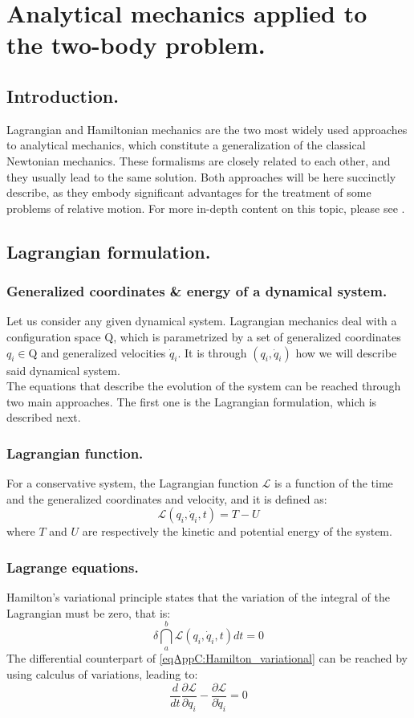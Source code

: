 \chapter{Analytical mechanics applied to the two-body problem.}
%
\label{app:App_C}
%
\section{Introduction.}
%
\indent Lagrangian and Hamiltonian mechanics are the two most widely used approaches to analytical mechanics, which constitute a generalization of the classical Newtonian mechanics. These formalisms are closely related to each other, and they usually lead to the same solution. Both approaches will be here succinctly describe, as they embody significant advantages for the treatment of some problems of relative motion. For more in-depth content on this topic, please see \cite{Wiesel, SCFormationFlying}.
%
\section{Lagrangian formulation.}
%
%
	\subsection{Generalized coordinates \& energy of a dynamical system.}
	\indent Let us consider any given dynamical system. Lagrangian mechanics deal with a configuration space $\mathrm{Q}$, which is parametrized by a set of generalized coordinates $q_i\in \mathrm{Q}$ and generalized velocities $\dot{q}_i$. It is through $(q_i, \dot{q}_i)$ how we will describe said dynamical system. \\
	\indent The equations that describe the evolution of the system can be reached through two main approaches. The first one is the Lagrangian formulation, which is described next.
	\subsection{Lagrangian function.}
	\indent For a conservative system, the Lagrangian function $\mathcal{L}$ is a function of the time and the generalized coordinates and velocity, and it is defined as:
	\[
	\mathcal{L} (q_i, \dot{q}_i, t) = T - U	
	\]
	\noindent where $T$ and $U$ are respectively the kinetic and potential energy of the system. 
	\subsection{Lagrange equations.}
	\indent Hamilton's variational principle states that the variation of the integral of the Lagrangian must be zero, that is: 
	\begin{equation}
	\delta \dint_a^b \mathcal{L}(q_i, \dot{q}_i, t) dt= 0
	\label{eqAppC:Hamilton_variational}
	\end{equation}
	\indent The differential counterpart of \eqref{eqAppC:Hamilton_variational} can be reached by using calculus of variations, leading to:
	\begin{equation}
	\label{eqAppC:Euler_lagrange}
	\dfrac{d}{dt} \dfrac{\partial \mathcal{L}}{\partial q_i} -\dfrac{\partial \mathcal{L}}{\partial \dot{q}_i} = 0
	\end{equation}
